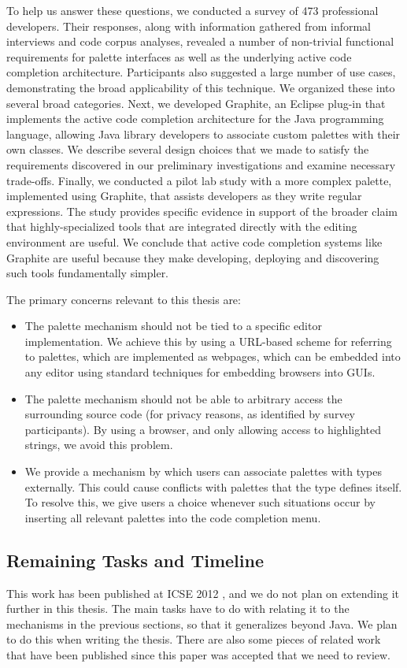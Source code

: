 To help us answer these questions, we conducted a survey of 473 professional developers. Their responses, along with information gathered from informal interviews and code corpus analyses, revealed a number of non-trivial functional requirements for palette interfaces as well as the underlying active code completion architecture. Participants also suggested a large number of use cases, demonstrating the broad applicability of this technique. We organized these into several broad categories. Next, we developed Graphite, an Eclipse plug-in that implements the active code completion architecture for the Java programming language, allowing Java library developers to associate custom palettes with their own classes. We describe several design choices that we made to satisfy the requirements discovered in our preliminary investigations and examine necessary trade-offs. Finally, we conducted a pilot lab study with a more complex palette, implemented using Graphite, that assists developers as they write regular expressions. The study provides specific evidence in support of the broader claim that highly-specialized tools that are integrated directly with the editing environment are  useful. We conclude that active code completion systems like Graphite are useful because they make developing, deploying and discovering such tools fundamentally simpler.

The primary concerns relevant to this thesis are:
\begin{itemize}
\item The palette mechanism should not be tied to a specific editor implementation. We achieve this by using a URL-based scheme for referring to palettes, which are implemented as webpages, which can be embedded into any editor using standard techniques for embedding browsers into GUIs.
\item The palette mechanism should not be able to arbitrary access the surrounding source code (for privacy reasons, as identified by survey participants). By using a browser, and only allowing access to highlighted strings, we avoid this problem.
\item We provide a mechanism by which users can associate palettes with types externally. This could cause conflicts with palettes that the type defines itself. To resolve this, we give users a choice whenever such situations occur by inserting all relevant palettes into the code completion menu.
\end{itemize}

\subsection{Remaining Tasks and Timeline}
This work has been published at ICSE 2012 \cite{omar-graphite12}, and we do not plan on extending it further in this thesis. The main tasks have to do with relating it to the mechanisms in the previous sections, so that it generalizes beyond Java. We plan to do this when writing the thesis. There are also some pieces of related work that have been published since this paper was accepted that we need to review. 
